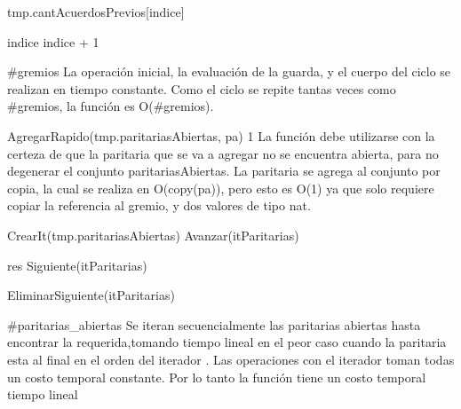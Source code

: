 {
	\state {} 					
			
		\state

		\state tmp.cantAcuerdosPrevios[indice] 			

		\state
		\state indice \asig indice + 1					
	\endwhile
}
{\#gremios}
{ La operaci\'on inicial, la evaluaci\'on de la guarda, y el cuerpo del ciclo se realizan en tiempo constante. Como el ciclo se repite tantas veces como \#gremios, la funci\'on es O(\#gremios). }


{
	\state AgregarRapido(tmp.paritariasAbiertas, pa)		
}
{1}
{ La funci\'on debe utilizarse con la certeza de que la paritaria que se va a agregar no se encuentra abierta, para no degenerar el conjunto paritariasAbiertas. La paritaria se agrega al conjunto por copia, la cual se realiza en O(copy(pa)), pero esto es O(1) ya que solo requiere copiar la referencia al gremio, y dos valores de tipo nat. }


{
	\state {} \asig CrearIt(tmp.paritariasAbiertas)		
			
		\state
		\state Avanzar(itParitarias)								
	\endwhile
	\state

	\state res \asig Siguiente(itParitarias)						

	\state EliminarSiguiente(itParitarias)							
}
{\#paritarias\_abiertas}
{Se iteran secuencialmente las paritarias abiertas hasta encontrar la requerida,tomando tiempo lineal en el peor caso cuando la paritaria esta al final en el orden del iterador
. Las operaciones con el iterador toman todas un costo temporal constante. Por lo tanto la funci\'on tiene un costo temporal tiempo lineal
}


